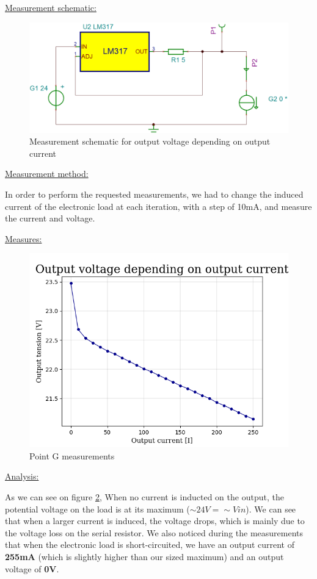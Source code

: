 {\clearpage

\underline{Measurement schematic:}
\begin{figure}[h]
	\centering
	\includegraphics[width=0.6\linewidth]{../../SchemaMesureChargeElectronique}
	\caption{Measurement schematic for output voltage depending on output current}
	\label{fig:schemamesurechargeelectronique}
\end{figure}

\underline{Measurement method:}

In order to perform the requested measurements, we had to change the induced current of the electronic load at each iteration, with a step of 10mA, and measure the current and voltage.\vspace{+6pt}

\underline{Measures:}
\begin{figure}[h]
	\centering
	\includegraphics[width=0.7\linewidth]{../../Grph-pointG}
	\caption{Point G measurements}
	\label{fig:grph-pointg}
\end{figure}

\clearpage
\underline{Analysis:}

As we can see on figure \ref{fig:grph-pointg}, When no current is inducted on the output, the potential voltage on the load is at its maximum (\textbf{$\sim 24V = \sim Vin$}). We can see that when a larger current is induced, the voltage drops, which is mainly due to the voltage loss on the serial resistor. We also noticed during the measurements that when the electronic load is short-circuited, we have an output current of \textbf{255mA} (which is slightly higher than our sized maximum) and an output voltage of \textbf{0V}.


}

